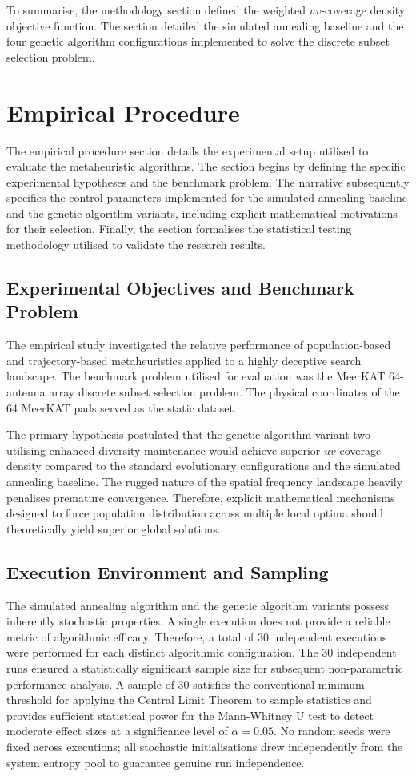 \documentclass[conference]{IEEEtran}
\begin{document}
To summarise, the methodology section defined the weighted $uv$-coverage density objective function. The 
section detailed the simulated annealing baseline and the four genetic algorithm configurations implemented 
to solve the discrete subset selection problem.
\section{Empirical Procedure}
\label{sec:empirical}

The empirical procedure section details the experimental setup utilised to evaluate the metaheuristic algorithms. The section begins by defining the specific experimental hypotheses and the benchmark problem. The narrative subsequently specifies the control parameters implemented for the simulated annealing baseline and the genetic algorithm variants, including explicit mathematical motivations for their selection. Finally, the section formalises the statistical testing methodology utilised to validate the research results.

\subsection{Experimental Objectives and Benchmark Problem}
The empirical study investigated the relative performance of population-based and trajectory-based 
metaheuristics applied to a highly deceptive search landscape. The benchmark problem utilised for 
evaluation was the MeerKAT 64-antenna array discrete subset selection problem. The physical coordinates 
of the 64 MeerKAT pads served as the static dataset.

The primary hypothesis postulated that the genetic algorithm variant two utilising enhanced diversity 
maintenance would achieve superior $uv$-coverage density compared to the standard 
evolutionary configurations and the simulated annealing baseline. The rugged nature of the spatial 
frequency landscape heavily penalises premature convergence. Therefore, explicit mathematical 
mechanisms designed to force population distribution across multiple local optima should theoretically 
yield superior global solutions. 

\subsection{Execution Environment and Sampling}
The simulated annealing algorithm and the genetic algorithm variants possess inherently stochastic properties. A single execution does not provide a reliable metric of algorithmic efficacy. Therefore, a total of 30 independent executions were performed for each distinct algorithmic configuration. The 30 independent runs ensured a statistically significant sample size for subsequent non-parametric performance analysis. A sample of 30 satisfies the conventional minimum threshold for applying the Central Limit Theorem to sample statistics and provides sufficient statistical power for the Mann-Whitney U test to detect moderate effect sizes at a significance level of $\alpha = 0.05$. No random seeds were fixed across executions; all stochastic initialisations drew independently from the system entropy pool to guarantee genuine run independence.
\end{document}
